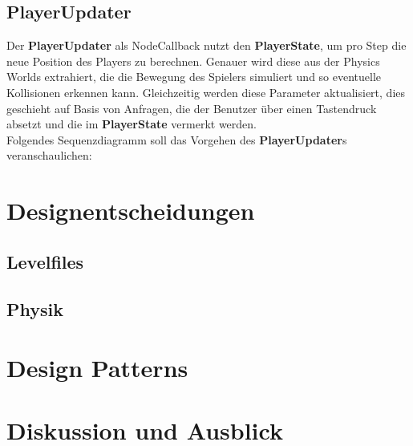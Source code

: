 \documentclass{llncs}
\begin{document}
\subsection{PlayerUpdater}
Der \textbf{PlayerUpdater} als NodeCallback nutzt den \textbf{PlayerState}, um pro Step die neue Position des Players
zu berechnen. Genauer wird diese aus der Physics Worlds extrahiert, die die Bewegung des Spielers simuliert und so
eventuelle Kollisionen erkennen kann. Gleichzeitig werden diese Parameter aktualisiert, dies geschieht auf Basis von
Anfragen, die der Benutzer \"uber einen Tastendruck absetzt und die im \textbf{PlayerState} vermerkt werden.\\
Folgendes Sequenzdiagramm soll das Vorgehen des \textbf{PlayerUpdater}s veranschaulichen:

\section{Designentscheidungen}
\subsection{Levelfiles}
\subsection{Physik}


\section{Design Patterns}



\section{Diskussion und Ausblick}
\end{document}
